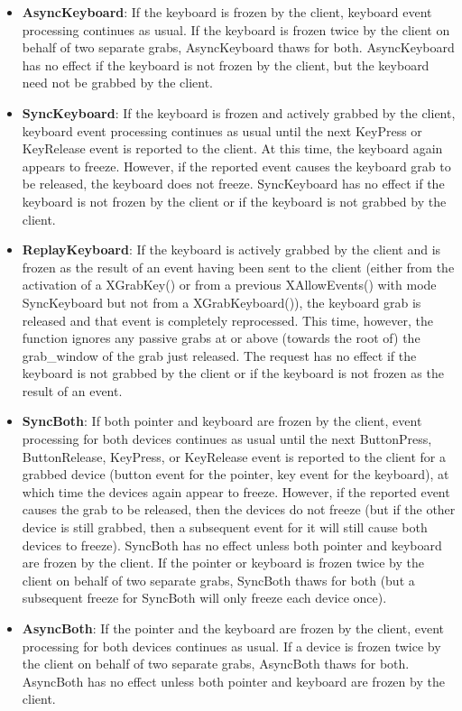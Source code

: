 \documentclass{report}
\begin{document}
\begin{itemize}
\begin{itemize}
                \item \textbf{AsyncKeyboard}:	If the keyboard is frozen by the client, keyboard event processing continues as usual. If the keyboard is frozen twice by the client on behalf of two separate grabs, AsyncKeyboard thaws for both. AsyncKeyboard has no effect if the keyboard is not frozen by the client, but the keyboard need not be grabbed by the client.
                \item \textbf{SyncKeyboard}:	If the keyboard is frozen and actively grabbed by the client, keyboard event processing continues as usual until the next KeyPress or KeyRelease event is reported to the client. At this time, the keyboard again appears to freeze. However, if the reported event causes the keyboard grab to be released, the keyboard does not freeze. SyncKeyboard has no effect if the keyboard is not frozen by the client or if the keyboard is not grabbed by the client.
                \item \textbf{ReplayKeyboard}:	If the keyboard is actively grabbed by the client and is frozen as the result of an event having been sent to the client (either from the activation of a XGrabKey() or from a previous XAllowEvents() with mode SyncKeyboard but not from a XGrabKeyboard()), the keyboard grab is released and that event is completely reprocessed. This time, however, the function ignores any passive grabs at or above (towards the root of) the grab\_window of the grab just released. The request has no effect if the keyboard is not grabbed by the client or if the keyboard is not frozen as the result of an event.
                \item \textbf{SyncBoth}:	If both pointer and keyboard are frozen by the client, event processing for both devices continues as usual until the next ButtonPress, ButtonRelease, KeyPress, or KeyRelease event is reported to the client for a grabbed device (button event for the pointer, key event for the keyboard), at which time the devices again appear to freeze. However, if the reported event causes the grab to be released, then the devices do not freeze (but if the other device is still grabbed, then a subsequent event for it will still cause both devices to freeze). SyncBoth has no effect unless both pointer and keyboard are frozen by the client. If the pointer or keyboard is frozen twice by the client on behalf of two separate grabs, SyncBoth thaws for both (but a subsequent freeze for SyncBoth will only freeze each device once).
                \item \textbf{AsyncBoth}:	If the pointer and the keyboard are frozen by the client, event processing for both devices continues as usual. If a device is frozen twice by the client on behalf of two separate grabs, AsyncBoth thaws for both. AsyncBoth has no effect unless both pointer and keyboard are frozen by the client.

\end{itemize}
\end{itemize}
\end{document}
